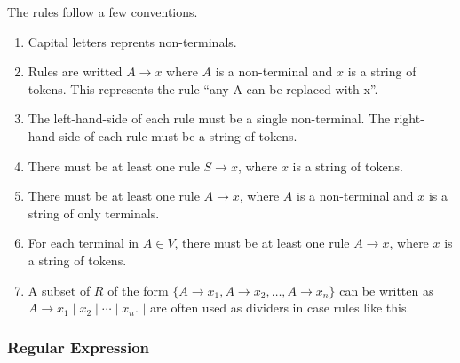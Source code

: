 \documentclass{article}
\begin{document}
	The rules follow a few conventions.
	\begin{enumerate}
		\item Capital letters reprents non-terminals.
		\item Rules are writted $A \rightarrow x$ where $A$ is a non-terminal and $x$ is a string of tokens. This represents the rule ``any A can be replaced with x''.
		\item The left-hand-side of each rule must be a single non-terminal. The right-hand-side of each rule must be a string of tokens.
		\item There must be at least one rule $S \rightarrow x$, where $x$ is a string of tokens.
		\item There must be at least one rule $A \rightarrow x$, where $A$ is a non-terminal and $x$ is a string of only terminals.
		\item For each terminal in $A \in V$, there must be at least one rule $A \rightarrow x$, where $x$ is a string of tokens.
		\item A subset of $R$ of the form $\{ A \rightarrow x_1, A \rightarrow x_2, \dots, A \rightarrow x_n \}$ can be written as $A \rightarrow x_1 \mid x_2 \mid \cdots \mid x_n$. $|$ are often used as dividers in case rules like this.
	\end{enumerate}

\subsubsection{Regular Expression}
\end{document}
